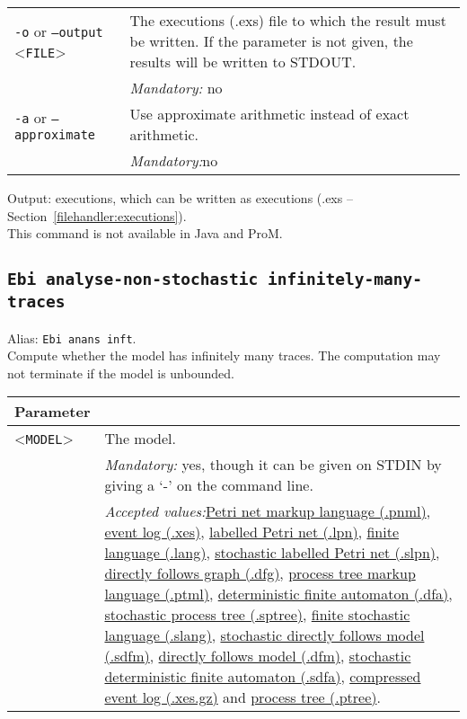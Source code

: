 {\begin{tabularx}{\linewidth}{lX}
\texttt{-o} or \texttt{--output} <\texttt{FILE}> &
The executions (.exs) file to which the result must be written. If the parameter is not given, the results will be written to STDOUT.\\
&\textit{Mandatory:} \quad no\\
\texttt{-a} or \texttt{--approximate} & Use approximate arithmetic instead of exact arithmetic.\\
&\textit{Mandatory:}\quad no\\
\bottomrule
\end{tabularx}
\noindent Output: executions, which can be written as  executions (.exs -- Section~\ref{filehandler:executions}).
\\This command is not available in Java and ProM.
\subsection{\texttt{Ebi analyse-non-stochastic infinitely-many-traces}}
\label{command:Ebi analyse-non-stochastic infinitely-many-traces}
Alias: \texttt{Ebi anans inft}.\\
Compute whether the model has infinitely many traces. The computation may not terminate if the model is unbounded.\\
\begin{tabularx}{\linewidth}{lX}
\toprule
Parameter \\\midrule
<\texttt{MODEL}>&The model.\\
&\textit{Mandatory:} \quad yes, though it can be given on STDIN by giving a `-' on the command line.\\
&\textit{Accepted values:}\quad \hyperref[filehandler:Petri net markup language]{Petri net markup language (.pnml)}, \hyperref[filehandler:event log]{event log (.xes)}, \hyperref[filehandler:labelled Petri net]{labelled Petri net (.lpn)}, \hyperref[filehandler:finite language]{finite language (.lang)}, \hyperref[filehandler:stochastic labelled Petri net]{stochastic labelled Petri net (.slpn)}, \hyperref[filehandler:directly follows graph]{directly follows graph (.dfg)}, \hyperref[filehandler:process tree markup language]{process tree markup language (.ptml)}, \hyperref[filehandler:deterministic finite automaton]{deterministic finite automaton (.dfa)}, \hyperref[filehandler:stochastic process tree]{stochastic process tree (.sptree)}, \hyperref[filehandler:finite stochastic language]{finite stochastic language (.slang)}, \hyperref[filehandler:stochastic directly follows model]{stochastic directly follows model (.sdfm)}, \hyperref[filehandler:directly follows model]{directly follows model (.dfm)}, \hyperref[filehandler:stochastic deterministic finite automaton]{stochastic deterministic finite automaton (.sdfa)}, \hyperref[filehandler:compressed event log]{compressed event log (.xes.gz)} and \hyperref[filehandler:process tree]{process tree (.ptree)}.\\

\end{tabularx}}
